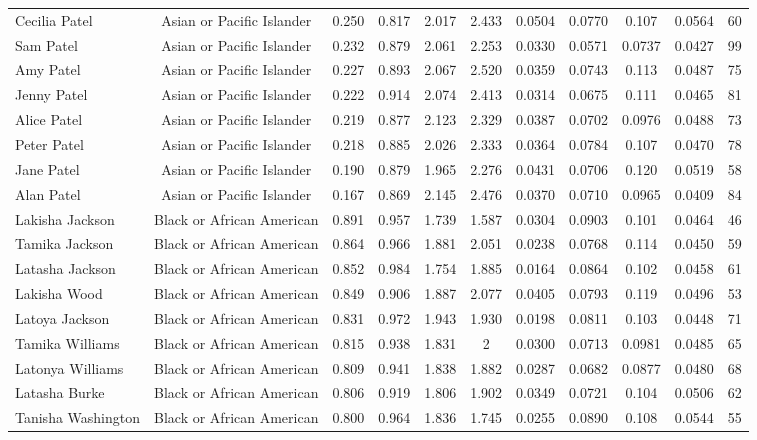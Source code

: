 \documentclass[]{article}
\begin{document}
\begin{tabular}{lcccccccccc}
Cecilia Patel & Asian or Pacific Islander & 0.250 & 0.817 & 2.017 & 2.433 & 0.0504 & 0.0770 & 0.107 & 0.0564 & 60 \\
Sam Patel & Asian or Pacific Islander & 0.232 & 0.879 & 2.061 & 2.253 & 0.0330 & 0.0571 & 0.0737 & 0.0427 & 99 \\
Amy Patel & Asian or Pacific Islander & 0.227 & 0.893 & 2.067 & 2.520 & 0.0359 & 0.0743 & 0.113 & 0.0487 & 75 \\
Jenny Patel & Asian or Pacific Islander & 0.222 & 0.914 & 2.074 & 2.413 & 0.0314 & 0.0675 & 0.111 & 0.0465 & 81 \\
Alice Patel & Asian or Pacific Islander & 0.219 & 0.877 & 2.123 & 2.329 & 0.0387 & 0.0702 & 0.0976 & 0.0488 & 73 \\
Peter Patel & Asian or Pacific Islander & 0.218 & 0.885 & 2.026 & 2.333 & 0.0364 & 0.0784 & 0.107 & 0.0470 & 78 \\
Jane Patel & Asian or Pacific Islander & 0.190 & 0.879 & 1.965 & 2.276 & 0.0431 & 0.0706 & 0.120 & 0.0519 & 58 \\
Alan Patel & Asian or Pacific Islander & 0.167 & 0.869 & 2.145 & 2.476 & 0.0370 & 0.0710 & 0.0965 & 0.0409 & 84 \\
Lakisha Jackson & Black or African American & 0.891 & 0.957 & 1.739 & 1.587 & 0.0304 & 0.0903 & 0.101 & 0.0464 & 46 \\
Tamika Jackson & Black or African American & 0.864 & 0.966 & 1.881 & 2.051 & 0.0238 & 0.0768 & 0.114 & 0.0450 & 59 \\
Latasha Jackson & Black or African American & 0.852 & 0.984 & 1.754 & 1.885 & 0.0164 & 0.0864 & 0.102 & 0.0458 & 61 \\
Lakisha Wood & Black or African American & 0.849 & 0.906 & 1.887 & 2.077 & 0.0405 & 0.0793 & 0.119 & 0.0496 & 53 \\
Latoya Jackson & Black or African American & 0.831 & 0.972 & 1.943 & 1.930 & 0.0198 & 0.0811 & 0.103 & 0.0448 & 71 \\
Tamika Williams & Black or African American & 0.815 & 0.938 & 1.831 & 2 & 0.0300 & 0.0713 & 0.0981 & 0.0485 & 65 \\
Latonya Williams & Black or African American & 0.809 & 0.941 & 1.838 & 1.882 & 0.0287 & 0.0682 & 0.0877 & 0.0480 & 68 \\
Latasha Burke & Black or African American & 0.806 & 0.919 & 1.806 & 1.902 & 0.0349 & 0.0721 & 0.104 & 0.0506 & 62 \\
Tanisha Washington & Black or African American & 0.800 & 0.964 & 1.836 & 1.745 & 0.0255 & 0.0890 & 0.108 & 0.0544 & 55 \\

\end{tabular}
\end{document}
